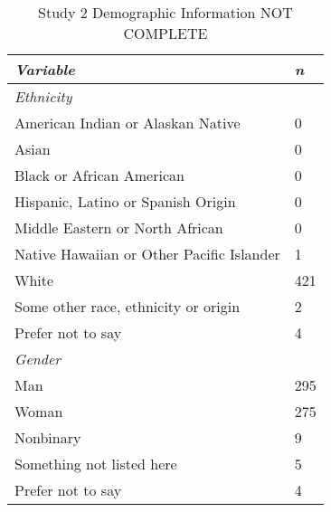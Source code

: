 \documentclass[12pt,]{article}
\begin{document}
\begin{table}[ht]
    \centering
    \begin{tabular}{l l}
        \toprule
        \emph{Variable} & \emph{n} \\
        \midrule
        \emph{Ethnicity} &  \\
        \hspace{1em} American Indian or Alaskan Native & 0 \\
        \hspace{1em} Asian & 0 \\
        \hspace{1em} Black or African American & 0 \\
        \hspace{1em} Hispanic, Latino or Spanish Origin & 0 \\
        \hspace{1em} Middle Eastern or North African& 0\\
        \hspace{1em} Native Hawaiian or Other Pacific Islander & 1 \\ 
        \hspace{1em} White & 421 \\ 
        \hspace{1em} Some other race, ethnicity or origin & 2 \\ 
        \hspace{1em} Prefer not to say & 4 \\ 
      \emph{Gender} & \\ 
         \hspace{1em} Man & 295 \\
         \hspace{1em} Woman & 275 \\
         \hspace{1em} Nonbinary & 9 \\
         \hspace{1em} Something not listed here & 5 \\
         \hspace{1em} Prefer not to say & 4 \\
        \bottomrule
    \end{tabular}
     \caption{Study 2 Demographic Information NOT COMPLETE}
     \label{demo2}
\end{table}



\end{document}
